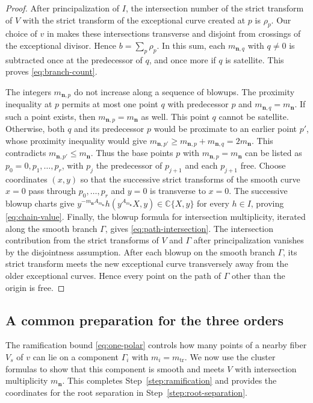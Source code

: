 \documentclass[11pt,letterpaper]{article}
\numberwithin{equation}{section}
\theoremstyle{remark}
\theoremstyle{plain}
\newcommand{\C}{\mathbb{C}}
\begin{document}
\begin{proof}
After principalization of $I$, the intersection number of the strict
transform of $V$ with the strict transform of the exceptional curve
created at $p$ is $\rho_p$.  Our choice
of $v$ in  makes these intersections transverse and
disjoint from crossings of the exceptional divisor.  Hence $b=\sum_p\rho_p$.
In this sum, each $m_{\boldsymbol n,q}$ with $q\neq0$ is subtracted
once at the predecessor of $q$, and once more if $q$ is satellite.
This proves \eqref{eq:branch-count}.

The integers $m_{\boldsymbol n,p}$ do not increase along a sequence
of blowups.  The proximity inequality at $p$ permits at most one
point $q$ with predecessor $p$ and $m_{\boldsymbol n,q}=m_{\boldsymbol n}$.
If such a point exists, then $m_{\boldsymbol n,p}=m_{\boldsymbol n}$ as well.
This point $q$ cannot be satellite.  Otherwise, both $q$ and its
predecessor $p$ would be proximate to an earlier point $p'$, whose
proximity inequality would give
$m_{\boldsymbol n,p'}\geq m_{\boldsymbol n,p}+m_{\boldsymbol n,q}=2m_{\boldsymbol n}$.
This contradicts $m_{\boldsymbol n,p'}\leq m_{\boldsymbol n}$.
Thus the base points $p$ with $m_{\boldsymbol n,p}=m_{\boldsymbol n}$
can be listed as $p_0=0,p_1,\ldots,p_r$, with $p_j$ the predecessor
of $p_{j+1}$ and each $p_{j+1}$ free.
Choose coordinates $(x,y)$ so that the successive strict transforms
of the smooth curve $x=0$ pass through $p_0,\ldots,p_r$ and $y=0$ is
transverse to $x=0$.  The successive blowup charts give
$y^{-m_{\boldsymbol n}A_{m_{\boldsymbol n}}}h(y^{A_{m_{\boldsymbol n}}}X,y)\in\C\{X,y\}$ for every
$h\in I$, proving \eqref{eq:chain-value}.  Finally, the blowup
formula for intersection multiplicity, iterated along the smooth
branch $\Gamma$, gives \eqref{eq:path-intersection}.  The intersection
contribution from the strict transforms of $V$ and $\Gamma$ after
principalization vanishes by the disjointness assumption.
After each blowup on the smooth branch $\Gamma$, its strict transform
meets the new exceptional curve transversely away from the older
exceptional curves.  Hence every point on the path of $\Gamma$ other than the origin
is free.
\end{proof}

\subsection{A common preparation for the three orders}

The ramification bound \eqref{eq:one-polar} controls how many points
of a nearby fiber $V_s$ of $v$ can lie on a component $\Gamma_i$
with $m_i=m_{\mathrm{tr}}$.  We now
use the cluster formulas to show that this component is smooth and
meets $V$ with intersection multiplicity $m_{\boldsymbol n}$.
This completes Step~\ref{step:ramification} and provides the
coordinates for the root separation in Step~\ref{step:root-separation}.
\end{document}

